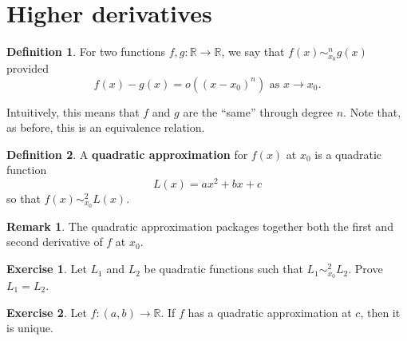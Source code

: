 \documentclass[12pt]{article}
\newcommand{\R}{\mathbb{R}}
\theoremstyle{plain}%
\theoremstyle{definition}
\newtheorem{definition}{Definition}[theorem]
\newtheorem{exercise}{Exercise}[theorem]
\newtheorem{remark}{Remark}
\begin{document}
\section{Higher derivatives}

\begin{definition}
For two functions $f, g : \R \to \R$, we say that $f(x) \sim^n_{x_0} g(x)$ provided
$$
f(x) - g(x) = o\left( \left(x - x_0\right)^n \right) \mbox{ as $x \to x_0$.}
$$
\end{definition}
\noindent
Intuitively, this means that $f$ and $g$ are the ``same'' through degree $n$.
Note that, as before, this is an equivalence relation.

\begin{definition}
A \textbf{quadratic approximation} for $f(x)$ at $x_0$ is a quadratic function
$$
L(x) = ax^2 + bx + c
$$
so that $f(x) \sim^2_{x_0} L(x)$.
\end{definition}

\begin{remark}
The quadratic approximation packages together both the first and second derivative of $f$ at $x_0$.
\end{remark}

\begin{exercise}
Let $L_1$ and $L_2$ be quadratic functions such that $L_1 \sim^2_{x_0} L_2$.  Prove $L_1 = L_2$.
\end{exercise}

\begin{exercise}
Let $f : (a,b) \to \R$.  If $f$ has a quadratic approximation at $c$, then it is unique.
\end{exercise}
\end{document}
